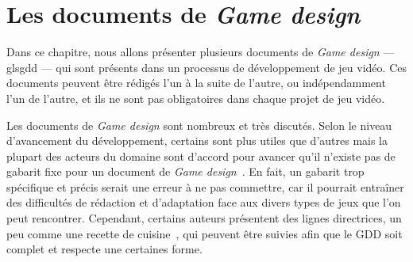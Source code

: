 \chapter{Les documents de \emph{Game design}}


Dans ce chapitre, nous allons pr\'esenter plusieurs documents de \emph{Game design} --- gls{gdd} --- qui sont présents dans un processus de développement de jeu vidéo. Ces documents peuvent être rédigés l'un à la suite de l'autre, ou indépendamment l'un de l'autre, et ils ne sont pas obligatoires dans chaque projet de jeu vidéo.



Les documents de \emph{Game design} sont nombreux et très discutés. Selon le niveau d'avancement du développement, certains sont plus utiles que d'autres mais la plupart des acteurs du domaine sont d'accord pour avancer qu'il n'existe pas de gabarit fixe pour un document de \emph{Game design}~\cite{GD_theory_rouse}. En fait, un gabarit trop sp\'ecifique et précis serait une erreur à ne pas commettre, car il pourrait entraîner des difficultés de rédaction et d'adaptation face aux divers types de jeux que l'on peut rencontrer. Cependant, certains auteurs présentent des lignes directrices, un peu comme une recette de cuisine~\cite{LevelUpRogers2014}, qui peuvent être suivies afin que le GDD soit complet et respecte une certaines forme. 






